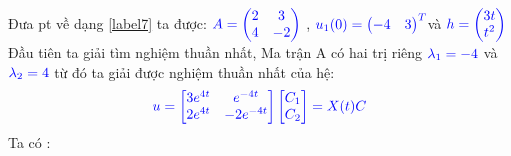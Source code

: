 \documentclass[a4paper]{article}
\begin{document}
 Đưa pt về dạng \eqref{label7} ta được: 
 \notag
 $\textcolor{blue}{A = \begin{pmatrix} 2 & 3\\ 4 & -2 \end{pmatrix}}$ , \enskip $\textcolor{blue}{u_1(0) = \begin{pmatrix} -4 & 3 \end{pmatrix}\sp{T}}$\enskip và   $\textcolor{blue}{h =\begin{pmatrix} 3t \\ t^{2}\end{pmatrix}}$\\
Đầu tiên ta giải tìm nghiệm thuần nhất, Ma trận A có hai trị riêng $\textcolor{blue}{\lambda_1=-4}$ và $\textcolor{blue}{\lambda_2=4 }$ từ đó  ta giải được nghiệm thuần nhất của hệ:\\
\begin{align}
\notag
\textcolor{blue}{u= \begin{bmatrix} 3e^{4t} & e^{-4t}\\ 2e^{4t} & -2e^{-4t} \end{bmatrix} \begin{bmatrix} C_1 \\ C_2 \end{bmatrix}=X(t)C}
\end{align}
Ta có :  
\end{document}
